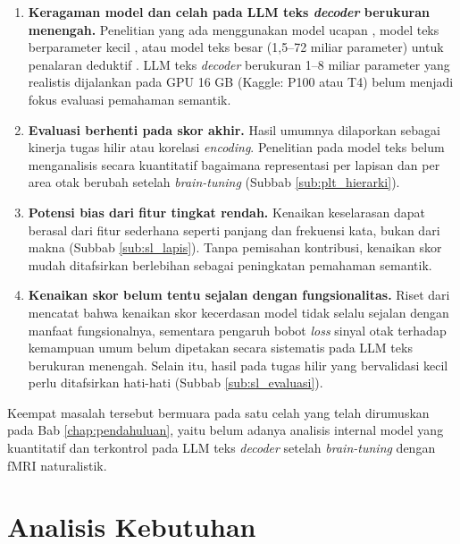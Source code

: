   \begin{enumerate}
      \item \textbf{Keragaman model dan celah pada LLM teks \textit{decoder} berukuran menengah.} Penelitian yang ada menggunakan model ucapan \autocite{moussa2025improving, moussa2026generalizability}, model teks berparameter kecil \autocite{schwartz2019inducing, negi2025brain}, atau model teks besar (1,5--72 miliar parameter) untuk penalaran deduktif \autocite{xiao2026beyond}. LLM teks \textit{decoder} berukuran 1--8 miliar parameter yang realistis dijalankan pada GPU 16 GB (Kaggle: P100 atau T4) belum menjadi fokus evaluasi pemahaman semantik.
      \item \textbf{Evaluasi berhenti pada skor akhir.} Hasil umumnya dilaporkan sebagai kinerja tugas hilir atau korelasi \textit{encoding}. Penelitian pada model teks belum menganalisis secara kuantitatif bagaimana representasi per lapisan dan per area otak berubah setelah \textit{brain-tuning} (Subbab \ref{sub:plt_hierarki}).
      \item \textbf{Potensi bias dari fitur tingkat rendah.} Kenaikan keselarasan dapat berasal dari fitur sederhana seperti panjang dan frekuensi kata, bukan dari makna (Subbab \ref{sub:sl_lapis}). Tanpa pemisahan kontribusi, kenaikan skor mudah ditafsirkan berlebihan sebagai peningkatan pemahaman semantik.
      \item \textbf{Kenaikan skor belum tentu sejalan dengan fungsionalitas.} Riset dari \textcite{xiao2026beyond} mencatat bahwa kenaikan skor kecerdasan model tidak selalu sejalan dengan manfaat fungsionalnya, sementara pengaruh bobot \textit{loss} sinyal otak terhadap kemampuan umum belum dipetakan secara sistematis pada LLM teks berukuran menengah. Selain itu, hasil pada tugas hilir yang bervalidasi kecil perlu ditafsirkan hati-hati (Subbab \ref{sub:sl_evaluasi}).
  \end{enumerate}

  Keempat masalah tersebut bermuara pada satu celah yang telah dirumuskan pada Bab \ref{chap:pendahuluan}, yaitu belum adanya analisis internal model yang kuantitatif dan terkontrol pada LLM teks \textit{decoder} setelah \textit{brain-tuning} dengan fMRI naturalistik.

  \section{Analisis Kebutuhan}
  \label{chap:am_kebutuhan}

